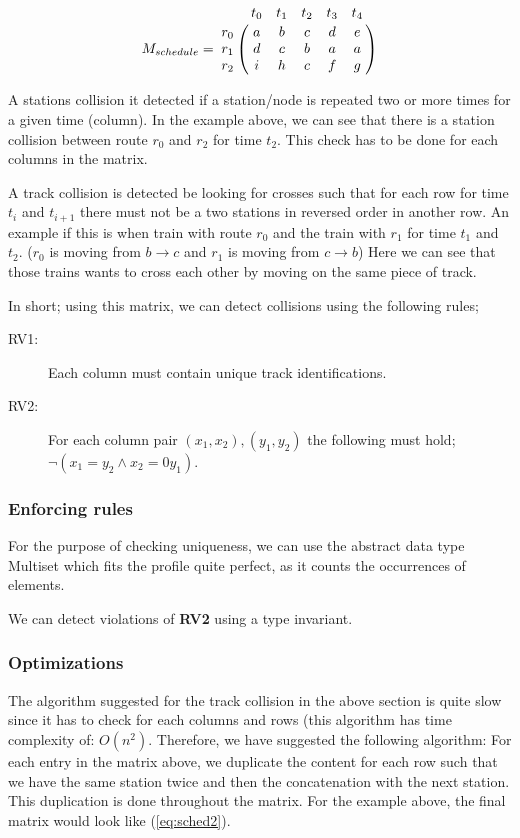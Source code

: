 \documentclass[10pt,a4paper]{article}
\let\bbordermatrix\bordermatrix
\begin{document}
\begin{equation}
M_{schedule} = \bbordermatrix{
                    ~ & t_0 & t_1 & t_2 & t_3 & t_4 \cr
                  r_0 & a   & b   & c   & d   & e\cr
                  r_1 & d   & c   & b   & a   & a\cr
                  r_2 & i   & h   & c   & f   & g}
\label{eq:sched1}
\end{equation}

A stations collision it detected if a station/node is repeated two or more times for a given time (column).
In the example above, we can see that there is a station collision between route $r_0$ and $r_2$ for time $t_2$.
This check has to be done for each columns in the matrix.
 
A track collision is detected be looking for crosses such that for each row for time $t_i$ and $t_{i+1}$ there must not be a two stations in reversed order in another row.
An example if this is when train with route $r_0$ and the train with $r_1$ for time $t_1$ and $t_2$. ($r_0$ is moving from $b \rightarrow c$ and $r_1$ is moving from $ c \rightarrow b $) Here we can see that those trains wants to cross each other by moving on the same piece of track.  

In short; using this matrix, we can detect collisions using the following rules;

\begin{description}
  \item[RV1:] Each column must contain unique track identifications.
  \item[RV2:] For each column pair $\left( x_1,x_2 \right), \left( y_1,y_2 \right)$ the following must hold;\\ $\lnot\left(x_1 = y_2 \land x_2 = 0y_1\right)$.
\end{description}

\subsubsection{Enforcing rules}
For the purpose of checking uniqueness, we can use the abstract data type Multiset which fits the profile quite perfect, as it counts the occurrences of elements. 

We can detect violations of \textbf{RV2} using a type invariant.
\subsubsection{Optimizations}
 
The algorithm suggested for the track collision in the above section is quite slow since it has to check for each columns and rows (this algorithm has time complexity of: $O(n^2)$.
Therefore, we have suggested the following algorithm:
For each entry in the matrix above, we duplicate the content for each row such that we have the same station twice and then the concatenation with the next station. This duplication is done throughout the matrix. For the example above, the final matrix would look like (\ref{eq:sched2}).
\end{document}
